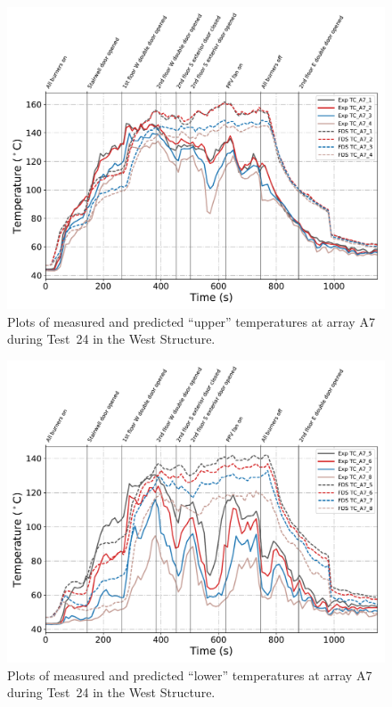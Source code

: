 \begin{figure}[!h]
	\centering
	\includegraphics[width=\columnwidth]{Figures/Plots/Validation/Temperature/Test_24_TC_A7_upper}
	\caption{Plots of measured and predicted ``upper'' temperatures at array A7 during Test~24 in the West Structure.}
	\label{fig:TCA7_upper_data_Test24}
\end{figure}
\begin{figure}[!h]
	\centering
	\includegraphics[width=\columnwidth]{Figures/Plots/Validation/Temperature/Test_24_TC_A7_lower}
	\caption{Plots of measured and predicted ``lower'' temperatures at array A7 during Test~24 in the West Structure.}
	\label{fig:TCA7_lower_data_Test24}
\end{figure}

